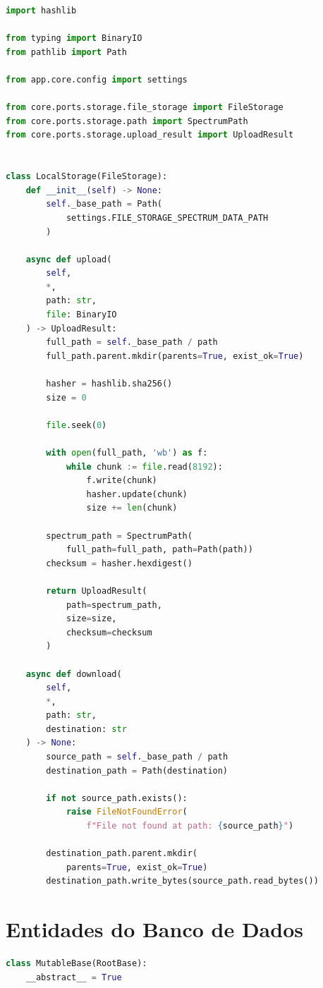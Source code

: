 \begin{apendicesenv}
\begin{lstlisting}[language=Python, caption={Implementação da interface de armazenamento no back-end}, label=lst:appendix-filestorage-implementation]
import hashlib

from typing import BinaryIO
from pathlib import Path

from app.core.config import settings

from core.ports.storage.file_storage import FileStorage
from core.ports.storage.path import SpectrumPath
from core.ports.storage.upload_result import UploadResult


class LocalStorage(FileStorage):
    def __init__(self) -> None:
        self._base_path = Path(
            settings.FILE_STORAGE_SPECTRUM_DATA_PATH
        )

    async def upload(
        self,
        *,
        path: str,
        file: BinaryIO
    ) -> UploadResult:
        full_path = self._base_path / path
        full_path.parent.mkdir(parents=True, exist_ok=True)

        hasher = hashlib.sha256()
        size = 0

        file.seek(0)

        with open(full_path, 'wb') as f:
            while chunk := file.read(8192):
                f.write(chunk)
                hasher.update(chunk)
                size += len(chunk)

        spectrum_path = SpectrumPath(
            full_path=full_path, path=Path(path))
        checksum = hasher.hexdigest()

        return UploadResult(
            path=spectrum_path,
            size=size,
            checksum=checksum
        )

    async def download(
        self,
        *,
        path: str,
        destination: str
    ) -> None:
        source_path = self._base_path / path
        destination_path = Path(destination)

        if not source_path.exists():
            raise FileNotFoundError(
                f"File not found at path: {source_path}")

        destination_path.parent.mkdir(
            parents=True, exist_ok=True)
        destination_path.write_bytes(source_path.read_bytes())
\end{lstlisting}

\chapter{Entidades do Banco de Dados}
\label{sec:appendix-database-entities}
\begin{lstlisting}[language=Python, caption={Definição, de uma entidade mutável em nível de banco de dados}, label={code:mutable_db}]
class MutableBase(RootBase):
    __abstract__ = True


\end{lstlisting}
\end{apendicesenv}
